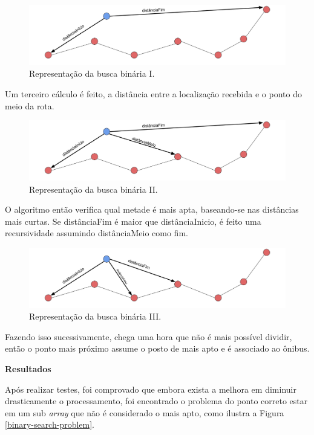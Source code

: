 \documentclass[
	12pt,				%
	oneside,			%
	a4paper,			%
	brazil				%
]{abntex2}
\begin{document}
\begin{figure}[H]
\centering
\includegraphics[width=12cm, center]{images/distanciainicio-distanciafim.png}
\caption{Representação da busca binária I.}
\label{Rotulo}
\end{figure}

Um terceiro cálculo é feito, a distância entre a localização recebida e o ponto do meio da rota.

\begin{figure}[H]
\centering
\includegraphics[width=12cm, center]{images/distanciainicio-distanciafim-distanciomeio.png}
\caption{Representação da busca binária II.}
\label{Rotulo}
\end{figure}

O algoritmo então verifica qual metade é mais apta, baseando-se nas distâncias mais curtas. Se distânciaFim é maior que distânciaInicio, é feito uma recursividade assumindo distânciaMeio como fim.

\begin{figure}[H]
\centering
\includegraphics[width=12cm, center]{images/nova-distancia.png}
\caption{Representação da busca binária III.}
\label{Rotulo}
\end{figure}

Fazendo isso sucessivamente, chega uma hora que não é mais possível dividir, então o ponto mais próximo assume o posto de mais apto e é associado ao ônibus.

\textbf{Resultados}

Após realizar testes, foi comprovado que embora exista a melhora em diminuir drasticamente o processamento, foi encontrado o problema do ponto correto estar em um sub \textit{array} que não é considerado o mais apto, como ilustra a Figura \ref{binary-search-problem}.
\end{document}
